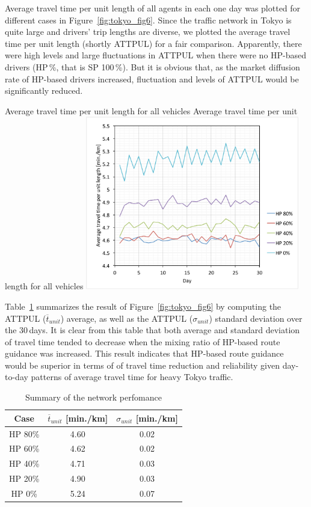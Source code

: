Average travel time per unit length of all agents in each one day was plotted for different cases in Figure~\ref{fig:tokyo_fig6}. Since the traffic network in Tokyo is quite large and drivers' trip lengths are diverse, we plotted the average travel time per unit length (shortly ATTPUL) for a fair comparison. Apparently, there were high levels and large fluctuations in ATTPUL when there were no HP-based drivers (HP\,\%, that is SP 100\,\%). But it is obvious that, as the market diffusion rate of HP-based drivers increased, fluctuation and levels of ATTPUL  would be significantly reduced.


\createfigure%
{Average travel time per unit length for all vehicles}%
{Average travel time per unit length for all vehicles}%
{\label{fig:tokyo_fig6}}%
{\includegraphics[width=0.70\textwidth, angle=0]{./scenarios/figures/tokyo_fig6.pdf}}%
{}


Table~\ref{tab:tokyo_1} summarizes the result of Figure~\ref{fig:tokyo_fig6} by computing the ATTPUL ($\overline{t}_{unit}$) average, as well as the ATTPUL ($\sigma_{unit}$) standard deviation over the 30\,days. It is clear from this table that both average and standard deviation of travel time tended to decrease when the mixing ratio of HP-based route guidance was increased. This result indicates that HP-based route guidance would be superior in terms of of travel time reduction and reliability given day-to-day patterns of average travel time for  heavy Tokyo traffic. 

\begin{table}[h]
		\small
		\caption{Summary of the network perfomance}
		\begin{tabular}{ccc}
			\hline
			Case & $\overline{t}_{unit}$ [min./km] & $\sigma_{unit}$ [min./km]\\
			\hline
			HP 80\%& 4.60& 0.02 \\
			HP 60\%& 4.62 & 0.02 \\
			HP 40\%& 4.71 & 0.03 \\
			HP 20\%& 4.90 & 0.03  \\
			HP 0\%& 5.24 & 0.07 \\
			\hline
		\end{tabular}
		\label{tab:tokyo_1}
\end{table}

